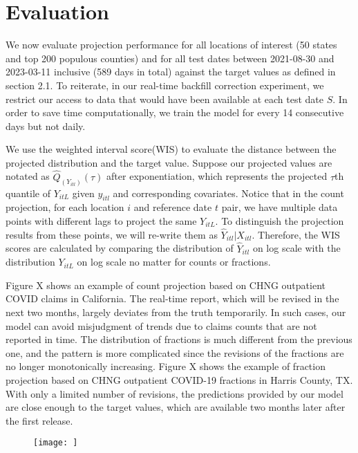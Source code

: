 
\section{Evaluation}

We now evaluate projection performance for all locations of interest (50 states and top 200 populous counties)  and for all test dates between 2021-08-30 and 2023-03-11 inclusive (589 days in total) against the target values as defined in section 2.1. To reiterate, in our real-time backfill correction experiment, we restrict our access to data that would have been available at each test date $S$. In order to save time computationally, we train the model for every 14 consecutive days but not daily. 

We use the weighted interval score(WIS) to evaluate the distance between the projected distribution and the target value. Suppose our projected values are notated as $\hat{Q}_{(Y_{itl})}(\tau)$ after exponentiation, which represents the projected $\tau$th quantile of $Y_{itL}$ given $y_{itl}$ and corresponding covariates. Notice that in the count projection, for each location $i$ and reference date $t$ pair, we have multiple data points with different lags to project the same $Y_{itL}$. To distinguish the projection results from these points, we will re-write them as $\hat{Y}_{itl}|X_{itl}$. Therefore, the WIS scores are calculated by comparing the distribution of $\hat{Y}_{itl}$ on log scale with the distribution $Y_{itL}$ on log scale no matter for counts or fractions. 

Figure X shows an example of count projection based on CHNG outpatient COVID claims in California. The real-time report, which will be revised in the next two months, largely deviates from the truth temporarily. In such cases, our model can avoid misjudgment of trends due to claims counts that are not reported in time. The distribution of fractions is much different from the previous one, and the pattern is more complicated since the revisions of the fractions are no longer monotonically increasing. 
Figure X shows the example of fraction projection based on CHNG outpatient COVID-19 fractions in Harris County, TX. With only a limited number of revisions, the predictions provided by our model are close enough to the target values, which are available two months later after the first release. 

\begin{figure}
    \centering
    \texttt{[image: ]}
    \caption{\textit{}}
\end{figure}

